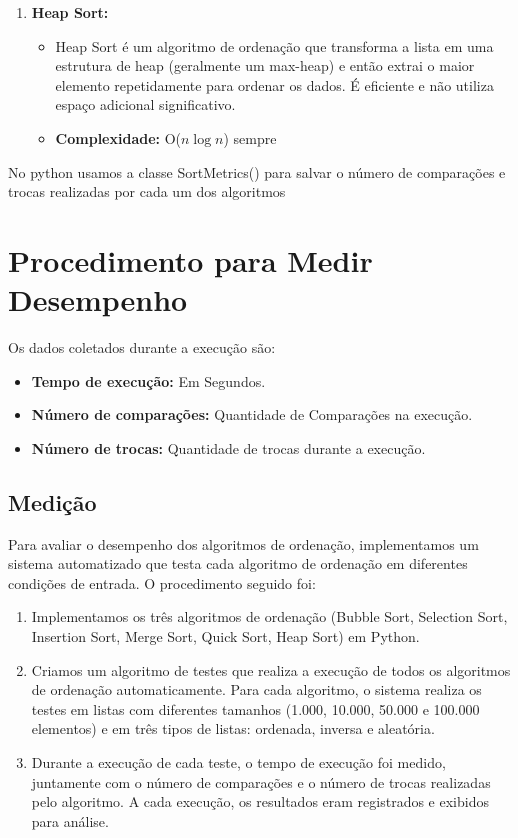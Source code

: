 \documentclass[12pt, a4paper]{report}
\begin{document}
\begin{enumerate}
    \item \textbf{Heap Sort:}
    \begin{itemize}
        \item Heap Sort é um algoritmo de ordenação que transforma a lista em uma estrutura de heap (geralmente um max-heap) e então extrai o maior elemento repetidamente para ordenar os dados. É eficiente e não utiliza espaço adicional significativo. 
        \item \textbf{Complexidade:} O($n \log n$) sempre
    \end{itemize}
    
    
\end{enumerate}
No python usamos a classe SortMetrics() para salvar o número de comparações e trocas realizadas por cada um dos algoritmos 


\section{Procedimento para Medir Desempenho}
Os dados coletados durante a execução são:
\begin{itemize}
    \item \textbf{Tempo de execução:} Em Segundos.
    \item \textbf{Número de comparações:} Quantidade de Comparações na execução.
    \item \textbf{Número de trocas:} Quantidade de trocas durante a execução.
\end{itemize}

\subsection*{Medição}

Para avaliar o desempenho dos algoritmos de ordenação, implementamos um sistema automatizado que testa cada algoritmo de ordenação em diferentes condições de entrada. O procedimento seguido foi:

\begin{enumerate}
    \item Implementamos os três algoritmos de ordenação (Bubble Sort, Selection Sort, Insertion Sort, Merge Sort, Quick Sort, Heap Sort) em Python.
    \item Criamos um algoritmo de testes que realiza a execução de todos os algoritmos de ordenação automaticamente. Para cada algoritmo, o sistema realiza os testes em listas com diferentes tamanhos (1.000, 10.000, 50.000 e 100.000 elementos) e em três tipos de listas: ordenada, inversa e aleatória.
    \item Durante a execução de cada teste, o tempo de execução foi medido, juntamente com o número de comparações e o número de trocas realizadas pelo algoritmo. A cada execução, os resultados eram registrados e exibidos para análise.
\end{enumerate}
\end{document}
